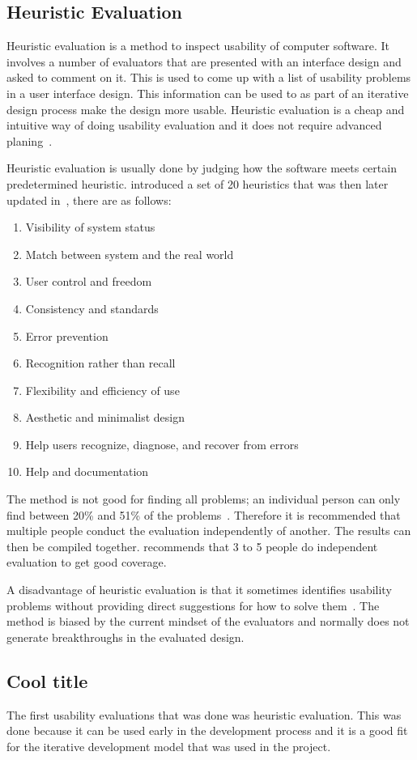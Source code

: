 \subsection{Heuristic Evaluation}
Heuristic evaluation is a method to inspect usability of computer software. It involves a number of evaluators that are presented with an interface design and asked to comment on it. This is used to come up with a list of usability problems in a user interface design. This information can be used to as part of an iterative design process make the design more usable. Heuristic evaluation is a cheap and intuitive way of doing usability evaluation and it does not require advanced planing~\cite{Nielsen1990}.

Heuristic evaluation is usually done by judging how the software meets certain predetermined heuristic. \cite{Nielsen1990} introduced a set of 20 heuristics that was then later updated in~\cite{Nielsen1994}, there are as follows:

\begin{enumerate}
  \item Visibility of system status
  \item Match between system and the real world
  \item User control and freedom
  \item Consistency and standards
  \item Error prevention
  \item Recognition rather than recall
  \item Flexibility and efficiency of use
  \item Aesthetic and minimalist design
  \item Help users recognize, diagnose, and recover from errors
  \item Help and documentation
\end{enumerate}

The method is not good for finding all problems; an individual person can only find between 20\% and 51\% of the problems~\cite{Nielsen1990}. Therefore it is recommended that multiple people conduct the evaluation independently of another. The results can then be compiled together. \cite{Nielsen1990} recommends that 3 to 5 people do independent evaluation to get good coverage.

A disadvantage of heuristic evaluation is that it sometimes identifies usability problems without providing direct suggestions for how to solve them~\cite{Nielsen1990}. The method is biased by the current mindset of the evaluators and normally does not generate breakthroughs in the evaluated design.

\subsection{Cool title}
The first usability evaluations that was done was heuristic evaluation. This was done because it can be used early in the development process and it is a good fit for the iterative development model that was used in the project.
